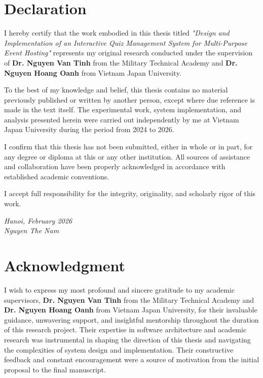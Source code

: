 \chapter*{Declaration}

I hereby certify that the work embodied in this thesis titled \textit{"Design and Implementation of an Interactive Quiz Management System for Multi-Purpose Event Hosting"} represents my original research conducted under the supervision of \textbf{Dr. Nguyen Van Tinh} from the Military Technical Academy and \textbf{Dr. Nguyen Hoang Oanh} from Vietnam Japan University.

To the best of my knowledge and belief, this thesis contains no material previously published or written by another person, except where due reference is made in the text itself. The experimental work, system implementation, and analysis presented herein were carried out independently by me at Vietnam Japan University during the period from 2024 to 2026.

I confirm that this thesis has not been submitted, either in whole or in part, for any degree or diploma at this or any other institution. All sources of assistance and collaboration have been properly acknowledged in accordance with established academic conventions.

I accept full responsibility for the integrity, originality, and scholarly rigor of this work.

\vspace{2cm}

\begin{flushright}
\textit{Hanoi, February 2026}\\[0.5cm]
\textit{Nguyen The Nam}
\end{flushright}

\cleardoublepage

\chapter*{Acknowledgment}
I wish to express my most profound and sincere gratitude to my academic supervisors, \textbf{Dr. Nguyen Van Tinh} from the Military Technical Academy and \textbf{Dr. Nguyen Hoang Oanh} from Vietnam Japan University, for their invaluable guidance, unwavering support, and insightful mentorship throughout the duration of this research project. Their expertise in software architecture and academic research was instrumental in shaping the direction of this thesis and navigating the complexities of system design and implementation. Their constructive feedback and constant encouragement were a source of motivation from the initial proposal to the final manuscript.

